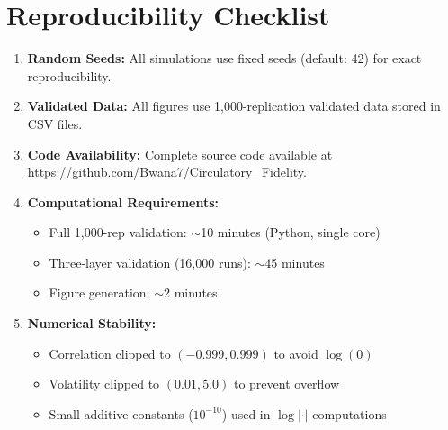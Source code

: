 \documentclass[10pt]{article} %
\theoremstyle{plain}
\theoremstyle{definition}
\begin{document}

\section{Reproducibility Checklist}
\label{app:reproducibility}

\begin{enumerate}
\item \textbf{Random Seeds:} All simulations use fixed seeds (default: 42) for exact reproducibility.

\item \textbf{Validated Data:} All figures use 1,000-replication validated data stored in CSV files.

\item \textbf{Code Availability:} Complete source code available at \url{https://github.com/Bwana7/Circulatory_Fidelity}.

\item \textbf{Computational Requirements:}
\begin{itemize}
\item Full 1,000-rep validation: $\sim$10 minutes (Python, single core)
\item Three-layer validation (16,000 runs): $\sim$45 minutes
\item Figure generation: $\sim$2 minutes
\end{itemize}

\item \textbf{Numerical Stability:}
\begin{itemize}
\item Correlation clipped to $(-0.999, 0.999)$ to avoid $\log(0)$
\item Volatility clipped to $(0.01, 5.0)$ to prevent overflow
\item Small additive constants ($10^{-10}$) used in $\log|\cdot|$ computations
\end{itemize}
\end{enumerate}


\small
\end{document}
